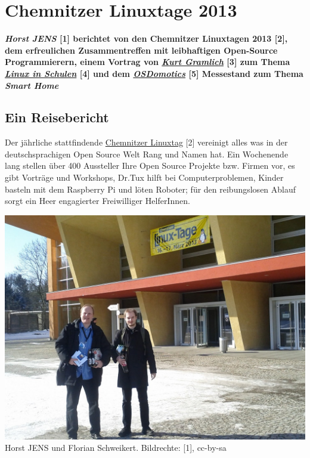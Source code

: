 \section*{Chemnitzer Linuxtage 2013}
\label{chemnitz}
\textbf{\textit{Horst JENS} [1] berichtet von den Chemnitzer Linuxtagen 2013 [2], dem erfreulichen Zusammentreffen mit leibhaftigen Open-Source Programmierern, einem Vortrag von \href{http://wiki.skolelinux.de/KurtGramlich/Biografie}{\textit{Kurt Gramlich}} [3] zum Thema \href{http://goo.gl/EoIDpy}{\textit{Linux in Schulen}} [4] und dem \href{http://osdomotics.com}{\textit{OSDomotics}}  [5] Messestand zum Thema \textit{Smart Home}}

\subsection*{Ein Reisebericht}

Der jährliche stattfindende \href{http://chemnitzer.linux-tage.de/2013/}{Chemnitzer Linuxtag} [2] vereinigt alles was in der deutschsprachigen Open Source Welt Rang und Namen hat. Ein Wochenende  lang stellen über 400 Aussteller Ihre Open Source Projekte bzw. Firmen vor, es gibt Vorträge und Workshops, Dr.Tux hilft bei Computerproblemen, Kinder basteln mit dem Raspberry Pi und löten Roboter; für den reibungslosen Ablauf sorgt ein Heer engagierter Freiwilliger HelferInnen.

\begin{center}
\includegraphics[width=\linewidth]{chemnitz/chemnitz_eroeffnung.jpg}
\footnotesize{Horst JENS und Florian Schweikert. Bildrechte: [1], cc-by-sa}
\end{center}


